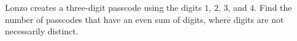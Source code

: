 Lonzo creates a three-digit passcode using the digits $1$, $2$, $3$, and $4$. Find the number of passcodes that have an even sum of digits, where digits are not necessarily distinct.
